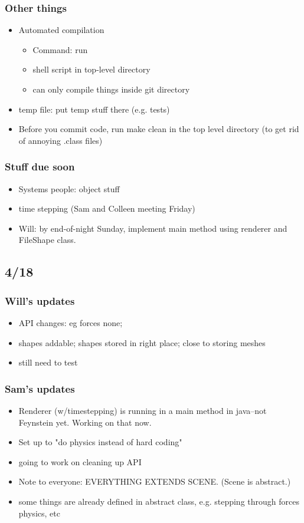 \subsubsection*{Other things}
\begin{itemize}
\item Automated compilation
  \begin{itemize}
  \item Command: run
  \item shell script in top-level directory
  \item can only compile things inside git directory
  \end{itemize}
\item temp file: put temp stuff there (e.g. tests)
\item Before you commit code, run make clean in the top level
  directory (to get rid of annoying .class files)
\end{itemize}

\subsubsection*{Stuff due soon}
\begin{itemize}
\item Systems people: object stuff
\item time stepping (Sam and Colleen meeting Friday)
\item Will: by end-of-night Sunday, implement main method using
  renderer and FileShape class.
\end{itemize}

\subsection*{4/18}

\subsubsection*{Will's updates}
\begin{itemize}
\item API changes: eg forces none;
\item shapes addable; shapes stored in right place; close to storing meshes
\item still need to test
\end{itemize}

\subsubsection*{Sam's updates}
\begin{itemize}
\item Renderer (w/timestepping) is running in a main method in
  java--not Feynstein yet. Working on that now.
\item Set up to "do physics instead of hard coding"
\item going to work on cleaning up API
\item Note to everyone: EVERYTHING EXTENDS SCENE. (Scene is abstract.)
\item some things are already defined in abstract class, e.g. stepping
  through forces physics, etc
\end{itemize}

